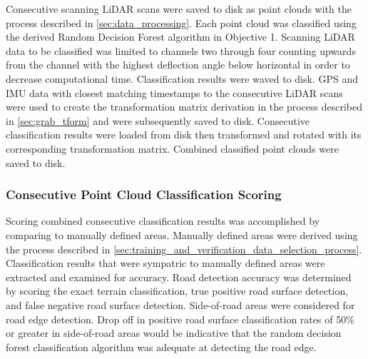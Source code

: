 \documentclass[numbered,pdftex]{ohio-etd}
\begin{document}
{{{{				{Consecutive scanning LiDAR scans were saved to disk as point clouds with the process described in \ref{sec:data_processing}. Each point cloud was classified using the derived Random Decision Forest algorithm in Objective 1. Scanning LiDAR data to be classified was limited to channels two through four counting upwards from the channel with the highest deflection angle below horizontal in order to decrease computational time. Classification results were waved to disk. GPS and IMU data with closest matching timestamps to the consecutive LiDAR scans were used to create the transformation matrix derivation in the process described in \ref{sec:grab_tform} and were subsequently saved to disk. Consecutive classification results were loaded from disk then transformed and rotated with its corresponding transformation matrix. Combined classified point clouds were saved to disk.}
				
			}
			
			\subsubsection{Consecutive Point Cloud Classification Scoring}\label{sec:consecutive_point_cloud_classification_scoring}{
			
				{Scoring combined consecutive classification results was accomplished by comparing to manually defined areas. Manually defined areas were derived using the process described in \ref{sec:training_and_verification_data_selection_process}. Classification results that were sympatric to manually defined areas were extracted and examined for accuracy. Road detection accuracy was determined by scoring the exact terrain classification, true positive road surface detection, and false negative road surface detection. Side-of-road areas were considered for road edge detection. Drop off in positive road surface classification rates of 50\% or greater in side-of-road areas would be indicative that the random decision forest classification algorithm was adequate at detecting the road edge.}
				
			}
		
		} %

	} %
	
} %


\newpage
	
	
\end{document}
